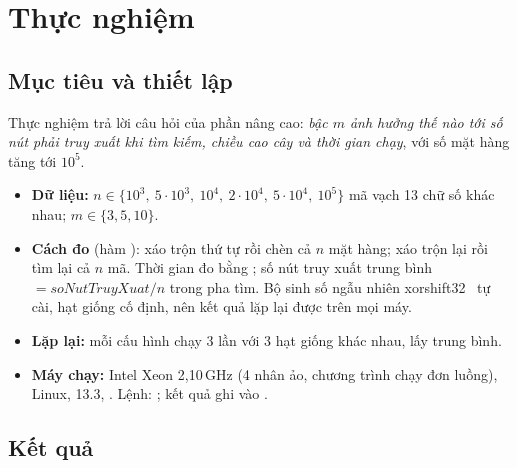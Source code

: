\chapter{Thực nghiệm}\label{chap:thucnghiem}

\section{Mục tiêu và thiết lập}

Thực nghiệm trả lời câu hỏi của phần nâng cao: \emph{bậc $m$ ảnh hưởng thế nào tới số nút phải truy xuất khi tìm
kiếm, chiều cao cây và thời gian chạy}, với số mặt hàng tăng tới $10^5$.

\begin{itemize}
  \item \textbf{Dữ liệu:} $n \in \{10^3,\ 5\cdot10^3,\ 10^4,\ 2\cdot10^4,\ 5\cdot10^4,\ 10^5\}$ mã vạch 13 chữ số khác
        nhau; $m \in \{3, 5, 10\}$.
  \item \textbf{Cách đo} (hàm ): xáo trộn thứ tự rồi chèn cả $n$ mặt hàng; xáo trộn lại rồi tìm lại
        cả $n$ mã. Thời gian đo bằng ; số nút truy xuất trung bình
        $= \mathit{soNutTruyXuat} / n$ trong pha tìm. Bộ sinh số ngẫu nhiên xorshift32~\cite{xorshift} tự cài, hạt
        giống cố định, nên kết quả lặp lại được trên mọi máy.
  \item \textbf{Lặp lại:} mỗi cấu hình chạy 3 lần với 3 hạt giống khác nhau, lấy trung bình.
  \item \textbf{Máy chạy:} Intel Xeon 2,10\,GHz (4 nhân ảo, chương trình chạy đơn luồng), Linux,  13.3,
        . Lệnh: ; kết quả ghi vào .
\end{itemize}

\section{Kết quả}

\pgfplotstableread[col sep=comma]{\CSV}\bangKQ

